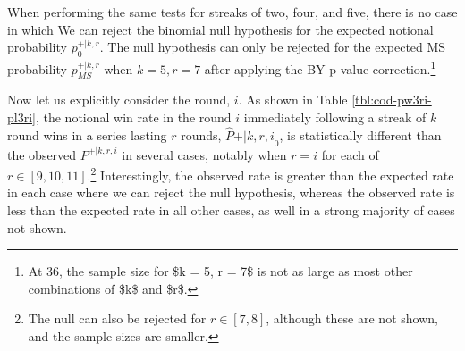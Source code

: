\documentclass{article}
\begin{document}
When performing the same tests for streaks of two, four, and five, there
is no case in which We can reject the binomial null hypothesis for the
expected notional probability \(p^{+|k,r}_0\). The null hypothesis can
only be rejected for the expected MS probability \(p^{+|k,r}_{MS}\) when
\(k = 5, r = 7\) after applying the BY p-value correction.\footnote{At
  36, the sample size for \$k = 5, r = 7\$ is not as large as most other
  combinations of \$k\$ and \$r\$.}

Now let us explicitly consider the round, \(i\). As shown in Table
\ref{tbl:cod-pw3ri-pl3ri}, the notional win rate in the round \(i\)
immediately following a streak of \(k\) round wins in a series lasting
\(r\) rounds, \(\hat{P}{+|k,r,i}_0\), is statistically different than
the observed \(P^{+|k,r,i}\) in several cases, notably when \(r = i\)
for each of \(r \in [9, 10, 11]\).\footnote{The null can also be
  rejected for \(r \in [7, 8]\), although these are not shown, and the
  sample sizes are smaller.} Interestingly, the observed rate is greater
than the expected rate in each case where we can reject the null
hypothesis, whereas the observed rate is less than the expected rate in
all other cases, as well in a strong majority of cases not shown.
\end{document}
